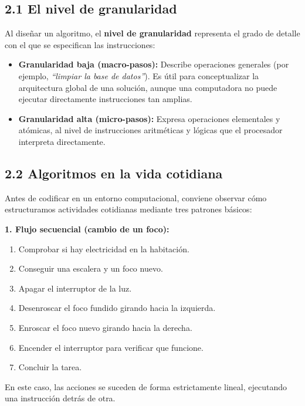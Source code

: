 \subsection{2.1 El nivel de
granularidad}\label{el-nivel-de-granularidad}

Al diseñar un algoritmo, el \textbf{nivel de granularidad} representa el
grado de detalle con el que se especifican las instrucciones:

\begin{itemize}
\tightlist
\item
  \textbf{Granularidad baja (macro-pasos):} Describe operaciones
  generales (por ejemplo, \emph{``limpiar la base de datos''}). Es útil
  para conceptualizar la arquitectura global de una solución, aunque una
  computadora no puede ejecutar directamente instrucciones tan amplias.
\item
  \textbf{Granularidad alta (micro-pasos):} Expresa operaciones
  elementales y atómicas, al nivel de instrucciones aritméticas y
  lógicas que el procesador interpreta directamente.
\end{itemize}

\subsection{2.2 Algoritmos en la vida
cotidiana}\label{algoritmos-en-la-vida-cotidiana}

Antes de codificar en un entorno computacional, conviene observar cómo
estructuramos actividades cotidianas mediante tres patrones básicos:

\textbf{1. Flujo secuencial (cambio de un foco):}

\begin{enumerate}
\def\labelenumi{\arabic{enumi}.}
\tightlist
\item
  Comprobar si hay electricidad en la habitación.
\item
  Conseguir una escalera y un foco nuevo.
\item
  Apagar el interruptor de la luz.
\item
  Desenroscar el foco fundido girando hacia la izquierda.
\item
  Enroscar el foco nuevo girando hacia la derecha.
\item
  Encender el interruptor para verificar que funcione.
\item
  Concluir la tarea.
\end{enumerate}

En este caso, las acciones se suceden de forma estrictamente lineal,
ejecutando una instrucción detrás de otra.

